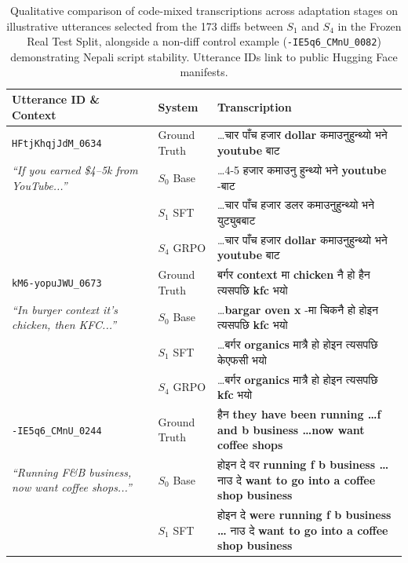 \documentclass[10pt,twocolumn,a4paper]{article}
\newcommand{\dev}[1]{{\devfont #1}}
\newcommand{\sys}[1]{$S_{#1}$}
\begin{document}
\begin{table}[H]
\centering
\fontsize{8.5pt}{9.8pt}\selectfont
\setlength{\tabcolsep}{3.0pt}
\renewcommand{\arraystretch}{0.84}
\caption{Qualitative comparison of code-mixed transcriptions across adaptation stages on illustrative utterances selected from the 173 diffs between \sys{1} and \sys{4} in the Frozen Real Test Split, alongside a non-diff control example (\texttt{-IE5q6\_CMnU\_0082}) demonstrating Nepali script stability. Utterance IDs link to public Hugging Face manifests.}
\label{tab:qualitative_examples}
\begin{tabularx}{\textwidth}{@{} >{\raggedright\arraybackslash}p{3.4cm} l X@{}}
\toprule
\textbf{Utterance ID \& Context} & \textbf{System} & \textbf{Transcription} \\
\midrule
\texttt{HFtjKhqjJdM\_0634} & Ground Truth & \dots \dev{चार पाँच हजार} \textbf{dollar} \dev{कमाउनुहुन्थ्यो भने} \textbf{youtube} \dev{बाट} \\
\textit{``If you earned \$4--5k from YouTube...''} & \sys{0} Base & \dots 4-5 \dev{हजार कमाउनु हुन्थ्यो भने} \textbf{youtube} \dev{-बाट} \\
& \sys{1} SFT & \dots \dev{चार पाँच हजार डलर कमाउनुहुन्थ्यो भने युट्युबबाट} \\
& \sys{4} GRPO & \dots \dev{चार पाँच हजार} \textbf{dollar} \dev{कमाउनुहुन्थ्यो भने} \textbf{youtube} \dev{बाट} \\
\midrule
\texttt{kM6-yopuJWU\_0673} & Ground Truth & \dev{बर्गर} \textbf{context} \dev{मा} \textbf{chicken} \dev{नै हो हैन त्यसपछि} \textbf{kfc} \dev{भयो} \\
\textit{``In burger context it's chicken, then KFC...''} & \sys{0} Base & \dots \textbf{bargar oven x} \dev{-मा चिकनै हो होइन त्यसपछि} \textbf{kfc} \dev{भयो} \\
& \sys{1} SFT & \dots \dev{बर्गर} \textbf{organics} \dev{मात्रै हो होइन त्यसपछि} \dev{केएफसी} \dev{भयो} \\
& \sys{4} GRPO & \dots \dev{बर्गर} \textbf{organics} \dev{मात्रै हो होइन त्यसपछि} \textbf{kfc} \dev{भयो} \\
\midrule
\texttt{-IE5q6\_CMnU\_0244} & Ground Truth & \dev{हैन} \textbf{they have been running \dots f and b business \dots now want coffee shops} \\
\textit{``Running F\&B business, now want coffee shops...''} & \sys{0} Base & \dev{होइन दे वर} \textbf{running f b business \dots} \dev{नाउ दे} \textbf{want to go into a coffee shop business} \\
& \sys{1} SFT & \dev{होइन दे} \textbf{were running f b business \dots} \dev{नाउ दे} \textbf{want to go into a coffee shop business} \\

\end{tabularx}
\end{table}
\end{document}
